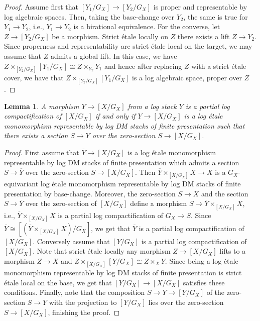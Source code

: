 \documentclass[11pt]{amsart}
\newtheorem{lemma}[theorem]{Lemma}
\theoremstyle{definition}
\theoremstyle{remark}
\begin{document}
\begin{proof}
	Assume first that $[Y_1/G_X]\to [Y_2/G_X]$ is proper and representable by log algebraic spaces.
	Then, taking the base-change over $Y_2$, the same is true for $Y_1\to Y_2$, i.e.,
	$Y_1\to Y_2$ is a birational equivalence.
	For the converse, let $Z\to [Y_2/G_X]$ be a morphism. Strict étale locally on $Z$ there exists a lift
	$Z\to Y_2$. Since properness and representability are strict étale local on the target,
	we may assume that $Z$ admits a global lift. In this case, we have $Z\times_{[Y_2/G_X]}[Y_1/G_X]\cong Z\times_{Y_2}Y_1$
	and hence after replacing $Z$ with a strict étale cover, we have that $Z\times_{[Y_2/G_X]}[Y_1/G_X]$ is a log
	algebraic space, proper over $Z$.
\end{proof}

\begin{lemma}
	A morphism $Y\to [X/G_X]$ from a log stack $Y$ is a partial log compactification
	of $[X/G_X]$ if and only if $Y\to [X/G_X]$ is
	a log étale monomorphism representable by log DM stacks of finite presentation such that
	there exists a section $S\to Y$ over the zero-section $S\to [X/G_X]$.
\end{lemma}

\begin{proof}
	First assume that $\overline{Y}\to [X/G_X]$ is a log étale monomorphism
	representable by log DM stacks of finite presentation which admits a section $S\to \overline{Y}$
	over the zero-section $S\to [X/G_X]$. Then $\overline{Y}\times_{[X/G_X]}X\to X$
	is a $G_X$-equivariant log étale monomorphism representable
	by log DM stacks of finite presentation by base-change.
	Moreover, the zero-section $S\to X$ and the section $S\to \overline{Y}$
	over the zero-section of $[X/G_X]$ define a morphism
	$S\to \overline{Y}\times_{[X/G_X]}X$, i.e., $\overline{Y}\times_{[X/G_X]}X$ is a partial log compactification
	of $G_X\to S$. Since $\overline{Y}\cong [(\overline{Y}\times_{[X/G_X]}X)/G_X]$, we
	get that $\overline{Y}$ is a partial log compactification of $[X/G_X]$.
	Conversely assume that $[Y/G_X]$ is a partial log compactification
	of $[X/G_X]$. Note that strict étale locally any morphism $Z\to [X/G_X]$
	lifts to a morphism $Z\to X$ and $Z\times_{[X/G_X]}[Y/G_X]\cong Z\times_{X}Y$.
	Since being a log étale monomorphism representable by log DM stacks of finite presentation
	is strict étale local on the base, we get that $[Y/G_X]\to [X/G_X]$ satisfies these
	conditions. Finally, note that the composition $S\to Y\to [Y/G_X]$ of the zero-section
	$S\to Y$ with the projection to $[Y/G_X]$ lies over the zero-section $S\to [X/G_X]$, finishing
	the proof.
\end{proof}
\end{document}
